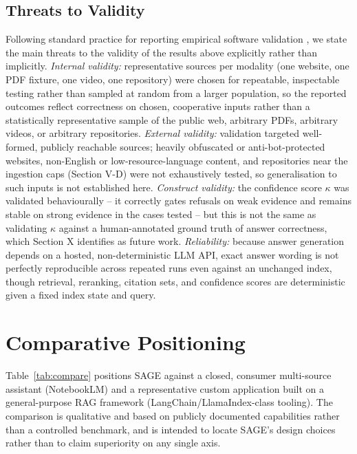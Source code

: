 \documentclass[conference]{IEEEtran}
\begin{document}
\subsection{Threats to Validity}
Following standard practice for reporting empirical software validation
\cite{slr2025rag,ragevalsurvey2025}, we state the main threats to the
validity of the results above explicitly rather than implicitly.
\emph{Internal validity:} representative sources per modality (one
website, one PDF fixture, one video, one repository) were chosen for
repeatable, inspectable testing rather than sampled at random from a
larger population, so the reported outcomes reflect correctness on
chosen, cooperative inputs rather than a statistically representative
sample of the public web, arbitrary PDFs, arbitrary videos, or arbitrary
repositories. \emph{External validity:} validation targeted well-formed,
publicly reachable sources; heavily obfuscated or anti-bot-protected
websites, non-English or low-resource-language content, and
repositories near the ingestion caps (Section V-D) were not exhaustively
tested, so generalisation to such inputs is not established here.
\emph{Construct validity:} the confidence score $\kappa$ was validated
behaviourally -- it correctly gates refusals on weak evidence and remains
stable on strong evidence in the cases tested -- but this is not the same
as validating $\kappa$ against a human-annotated ground truth of answer
correctness, which Section X identifies as future work. \emph{Reliability:}
because answer generation depends on a hosted, non-deterministic LLM
API, exact answer wording is not perfectly reproducible across repeated
runs even against an unchanged index, though retrieval, reranking,
citation sets, and confidence scores are deterministic given a fixed
index state and query.

\section{Comparative Positioning}

Table~\ref{tab:compare} positions SAGE against a closed, consumer
multi-source assistant (NotebookLM) and a representative custom
application built on a general-purpose RAG framework (LangChain/LlamaIndex-class
tooling). The comparison is qualitative and based on publicly documented
capabilities rather than a controlled benchmark, and is intended to
locate SAGE's design choices rather than to claim superiority on any
single axis.
\end{document}
